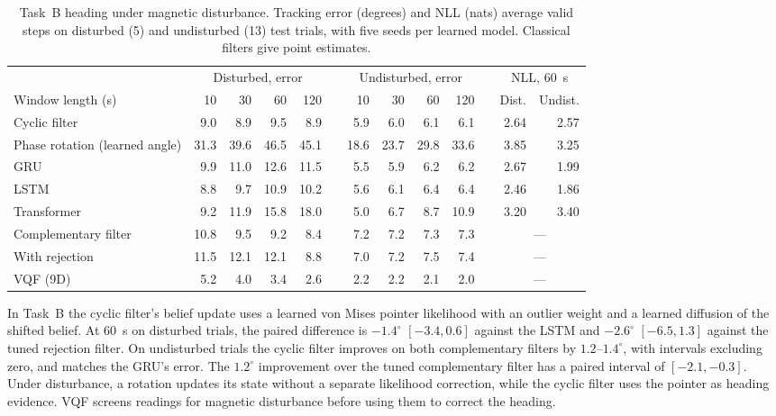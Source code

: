 \begin{table}[H]
\centering\small
\setlength{\tabcolsep}{4.5pt}
\caption{Task~B heading under magnetic disturbance. Tracking error
(degrees) and NLL (nats) average valid steps on disturbed (5) and
undisturbed (13) test trials, with five seeds per learned model.
Classical filters give point estimates.}
\label{tab:imu-b}
\begin{tabular}{lrrrrcrrrrcrr}
\toprule
& \multicolumn{4}{c}{Disturbed, error} && \multicolumn{4}{c}{Undisturbed, error} && \multicolumn{2}{c}{NLL, 60~s} \\
\cmidrule{2-5}\cmidrule{7-10}\cmidrule{12-13}
Window length (s) & 10 & 30 & 60 & 120 && 10 & 30 & 60 & 120 && Dist. & Undist. \\
\midrule
Cyclic filter & 9.0 & 8.9 & 9.5 & 8.9 && 5.9 & 6.0 & 6.1 & 6.1 && 2.64 & 2.57 \\
Phase rotation (learned angle) & 31.3 & 39.6 & 46.5 & 45.1 && 18.6 & 23.7 & 29.8 & 33.6 && 3.85 & 3.25 \\
GRU & 9.9 & 11.0 & 12.6 & 11.5 && 5.5 & 5.9 & 6.2 & 6.2 && 2.67 & 1.99 \\
LSTM & 8.8 & 9.7 & 10.9 & 10.2 && 5.6 & 6.1 & 6.4 & 6.4 && 2.46 & 1.86 \\
Transformer & 9.2 & 11.9 & 15.8 & 18.0 && 5.0 & 6.7 & 8.7 & 10.9 && 3.20 & 3.40 \\
\midrule
Complementary filter & 10.8 & 9.5 & 9.2 & 8.4 && 7.2 & 7.2 & 7.3 & 7.3 && \multicolumn{2}{c}{---} \\
With rejection & 11.5 & 12.1 & 12.1 & 8.8 && 7.0 & 7.2 & 7.5 & 7.4 && \multicolumn{2}{c}{---} \\
VQF (9D) & 5.2 & 4.0 & 3.4 & 2.6 && 2.2 & 2.2 & 2.1 & 2.0 && \multicolumn{2}{c}{---} \\
\bottomrule
\end{tabular}
\end{table}

In Task~B the cyclic filter's belief update uses a learned von Mises pointer
likelihood with an outlier weight and a learned diffusion of the shifted
belief. At 60~s on disturbed trials, the paired difference is $-1.4^\circ$
$[-3.4,0.6]$ against the LSTM and $-2.6^\circ$ $[-6.5,1.3]$ against the tuned
rejection filter. On undisturbed trials the cyclic filter improves on both
complementary filters by $1.2$--$1.4^\circ$, with intervals excluding zero,
and matches the GRU's error. The $1.2^\circ$ improvement over the tuned
complementary filter has a paired interval of $[-2.1,-0.3]$. Under
disturbance, a rotation updates its state without a separate likelihood
correction, while the cyclic filter uses the pointer as heading evidence.
VQF screens readings for magnetic disturbance before using them to
correct the heading.

